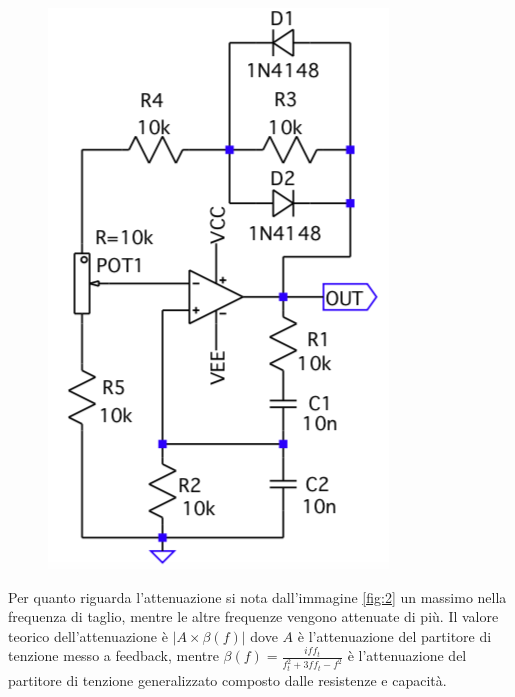 \documentclass{article}
\begin{document}
\begin{figure}[htb]
\begin{minipage}[t]{.5\linewidth}
			\includegraphics[width=\linewidth]{figure/circ2.png}
			\label{fig:circ2}
	    \end{minipage}
	\end{figure}
	Per quanto riguarda l'attenuazione si nota dall'immagine \ref{fig:2} un massimo nella frequenza di taglio, mentre le altre frequenze vengono attenuate di più.\newline
	Il valore teorico dell'attenuazione è $|A\times\beta(f)|$ dove $A$ è l'attenuazione del partitore di tenzione messo a feedback, mentre $\beta(f)=\frac{iff_t}{f_t^2+3ff_t-f^2}$ è l'attenuazione del partitore di tenzione generalizzato composto dalle resistenze e capacità.\newline
\end{document}
